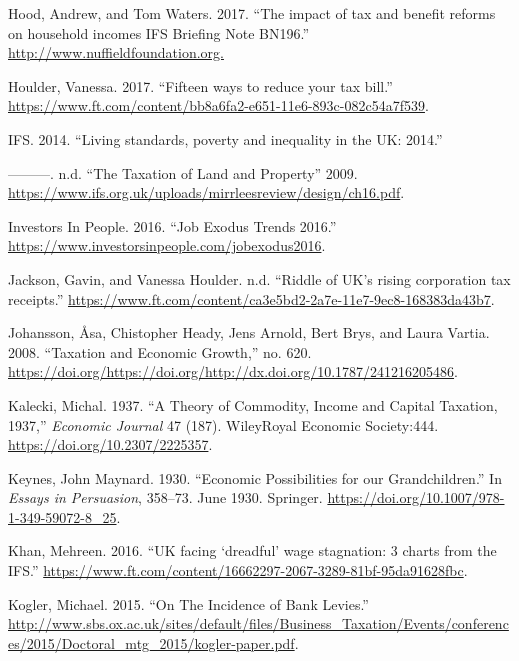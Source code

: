 \documentclass[]{tufte-handout}
\begin{document}
\leavevmode\hypertarget{ref-Hood2017}{}%
Hood, Andrew, and Tom Waters. 2017. ``The impact of tax and benefit
reforms on household incomes IFS Briefing Note BN196.''
\url{http://www.nuffieldfoundation.org.}

\leavevmode\hypertarget{ref-Houlder2017}{}%
Houlder, Vanessa. 2017. ``Fifteen ways to reduce your tax bill.''
\url{https://www.ft.com/content/bb8a6fa2-e651-11e6-893c-082c54a7f539}.

\leavevmode\hypertarget{ref-IFS2014}{}%
IFS. 2014. ``Living standards, poverty and inequality in the UK: 2014.''

\leavevmode\hypertarget{ref-IFS}{}%
---------. n.d. ``The Taxation of Land and Property'' 2009.
\url{https://www.ifs.org.uk/uploads/mirrleesreview/design/ch16.pdf}.

\leavevmode\hypertarget{ref-InvestorsinPeopleHQ2016}{}%
Investors In People. 2016. ``Job Exodus Trends 2016.''
\url{https://www.investorsinpeople.com/jobexodus2016}.

\leavevmode\hypertarget{ref-JacksonHoulder}{}%
Jackson, Gavin, and Vanessa Houlder. n.d. ``Riddle of UK's rising
corporation tax receipts.''
\url{https://www.ft.com/content/ca3e5bd2-2a7e-11e7-9ec8-168383da43b7}.

\leavevmode\hypertarget{ref-Johansson2008}{}%
Johansson, Åsa, Chistopher Heady, Jens Arnold, Bert Brys, and Laura
Vartia. 2008. ``Taxation and Economic Growth,'' no. 620.
\url{https://doi.org/https://doi.org/http://dx.doi.org/10.1787/241216205486}.

\leavevmode\hypertarget{ref-Kalecki1937}{}%
Kalecki, Michal. 1937. ``A Theory of Commodity, Income and Capital
Taxation, 1937,'' \emph{Economic Journal} 47 (187). WileyRoyal Economic
Society:444. \url{https://doi.org/10.2307/2225357}.

\leavevmode\hypertarget{ref-Keynes1930}{}%
Keynes, John Maynard. 1930. ``Economic Possibilities for our
Grandchildren.'' In \emph{Essays in Persuasion}, 358--73. June 1930.
Springer. \url{https://doi.org/10.1007/978-1-349-59072-8_25}.

\leavevmode\hypertarget{ref-Khan2016}{}%
Khan, Mehreen. 2016. ``UK facing `dreadful' wage stagnation: 3 charts
from the IFS.''
\url{https://www.ft.com/content/16662297-2067-3289-81bf-95da91628fbc}.

\leavevmode\hypertarget{ref-Kogler2015}{}%
Kogler, Michael. 2015. ``On The Incidence of Bank Levies.''
\url{http://www.sbs.ox.ac.uk/sites/default/files/Business_Taxation/Events/conferences/2015/Doctoral_mtg_2015/kogler-paper.pdf}.
\end{document}
